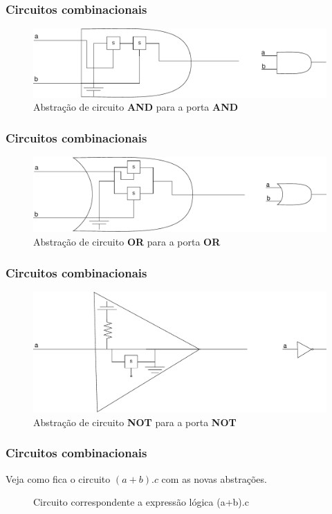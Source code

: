 \begin{frame}
	\frametitle{Circuitos combinacionais}
	\begin{figure}
		\centering
		\includegraphics[width=0.7\linewidth]{images/portaEAbstrata}
		\caption{Abstração de circuito \textbf{AND} para a porta \textbf{AND}}
		\label{fig:portaeabstrata}
	\end{figure}
\end{frame}

\begin{frame}
	\frametitle{Circuitos combinacionais}
	\begin{figure}
		\centering
		\includegraphics[width=0.7\linewidth]{images/portaOUAbstrata}
		\caption{Abstração de circuito \textbf{OR} para a porta \textbf{OR}}
		\label{fig:portaouabstrata}
	\end{figure}
\end{frame}

\begin{frame}
	\frametitle{Circuitos combinacionais}
	\begin{figure}
		\centering
		\includegraphics[width=0.7\linewidth]{images/portaNOTAbstrata}
		\caption{Abstração de circuito \textbf{NOT} para a porta \textbf{NOT}}
		\label{fig:portanotabstrata}
	\end{figure}
\end{frame}

\begin{frame}
	\frametitle{Circuitos combinacionais}
	\par Veja como fica o circuito $(a+b).c$ com as novas abstrações.
	\begin{figure}
		\centering
		
		\caption{Circuito correspondente a expressão lógica (a+b).c}
		\label{fig:circuitoAndOr}
	\end{figure}
\end{frame}


